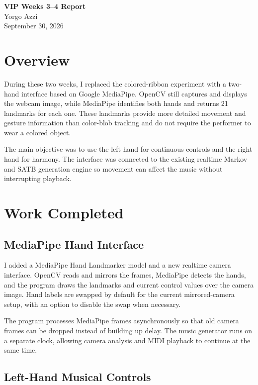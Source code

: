 \documentclass[11pt,a4paper]{article}
\begin{document}
\begin{center}
    {\Large\bfseries VIP Weeks 3--4 Report}\\[0.5em]
    {\large Yorgo Azzi}\\[0.25em]
    September 30, 2026
\end{center}

\section{Overview}

During these two weeks, I replaced the colored-ribbon experiment with a
two-hand interface based on Google MediaPipe. OpenCV still captures and
displays the webcam image, while MediaPipe identifies both hands and returns
21 landmarks for each one. These landmarks provide more detailed movement and
gesture information than color-blob tracking and do not require the performer
to wear a colored object.

The main objective was to use the left hand for continuous controls and the
right hand for harmony. The interface was connected to the existing realtime
Markov and SATB generation engine so movement can affect the music without
interrupting playback.

\section{Work Completed}

\subsection{MediaPipe Hand Interface}

I added a MediaPipe Hand Landmarker model and a new realtime camera interface.
OpenCV reads and mirrors the frames, MediaPipe detects the hands, and the
program draws the landmarks and current control values over the camera image.
Hand labels are swapped by default for the current mirrored-camera setup, with
an option to disable the swap when necessary.

The program processes MediaPipe frames asynchronously so that old camera
frames can be dropped instead of building up delay. The music generator runs
on a separate clock, allowing camera analysis and MIDI playback to continue at
the same time.

\subsection{Left-Hand Musical Controls}
\end{document}
